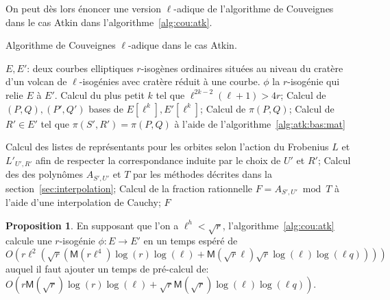 \documentclass[10pt,a4paper]{book}
\theoremstyle{plain}
\theoremstyle{definition}
\theoremstyle{definition}
\theoremstyle{definition}
\newtheorem{prop}[thm]{Proposition}
\theoremstyle{definition}
\theoremstyle{remark}
\theoremstyle{remark}
\theoremstyle{definition}
\begin{document}
On peut dès lors énoncer une version $\ell$-adique de l'algorithme de 
Couveignes dans le cas Atkin dans l'algorithme~\ref{alg:cou:atk}.
\begin{algorithm}
\caption{\label{alg:cou:atk} Algorithme de Couveignes $\ell$-adique dans le cas Atkin.}
\begin{algorithmic}[1]
\REQUIRE $E,E'$: deux courbes elliptiques $r$-isogènes ordinaires situées au niveau du cratère d'un volcan de $\ell$-isogénies avec cratère réduit à une courbe.
\ENSURE $\phi$ la $r$-isogénie qui relie $E$ à $E'$.
\STATE Calcul du plus petit $k$ tel que $\ell^{2k-2}(\ell+1)>4r$;
\STATE \label{alg:cou:atk:bas} 
Calcul de $(P,Q),(P',Q')$ bases de $E[\ell^k],E'[\ell^k]$;
\STATE \label{alg:cou:atk:frob:bas} Calcul de $\pi(P,Q)$;
 \label{alg:cou:atk:parc:poi}
\STATE \label{alg:cou:atk:matc:fro} Calcul de $R' \in E'$ tel que $\pi(S',R')=\pi(P,Q)$ à l'aide de l'algorithme~\ref{alg:atk:bas:mat}
 \label{alg:cou:atk:div:h}

\STATE Calcul des listes de représentants pour les orbites selon l'action du Frobenius $L$ et $L'_{U',R'}$ afin de respecter la correspondance induite par le choix de $U'$ et $R'$; \label{alg:cou:atk:rep}
\STATE \label{alg:cou:atk:int} Calcul des des polynômes $A_{S',U'}$ et $T$ par les méthodes décrites dans la section~\ref{sec:interpolation};
\STATE \label{alg:cou:atk:Cauchy} Calcul de la fraction rationnelle $F=A_{S',U'} \bmod T$ à l'aide d'une interpolation de Cauchy;
 \label{alg:cou:atk:test}
\RETURN $F$
\ENDIF
\ENDFOR
\ENDFOR 
\end{algorithmic}
\end{algorithm}

\begin{prop}
  \label{pro:atk:full-complexity}
  En supposant que l'on a $\ell^h<\sqrt{r}$, 
  l'algorithme~\ref{alg:cou:atk} calcule une $r$-isogénie 
  ${\phi:E \rightarrow E'}$ en un temps espéré de \[
  O(r \ell^2 (\sqrt{r}(\mathsf{M}(r\ell^4)\log(r)\log(\ell)+\mathsf{M}(\sqrt{r}\ell)\sqrt{r}\log(\ell)\log(\ell q))))\]
auquel il faut ajouter un temps de pré-calcul de:
$O(r \mathsf{M}(\sqrt{r})\log(r)\log(\ell)+ \sqrt{r} \mathsf{M}(\sqrt{r})\log(\ell)\log(\ell q))$.
\end{prop}
\end{document}
